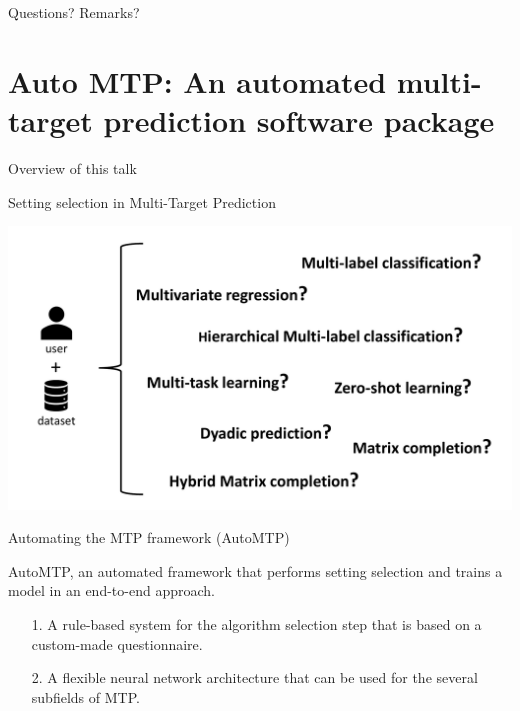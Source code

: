\documentclass[]{beamer}
\begin{document}
\begin{frame}{Questions? Remarks?}
\end{frame}

\section{Auto MTP: An automated multi-target prediction software package}

\begin{frame}{Overview of this talk}

\tableofcontents

\end{frame}

\begin{frame}{Setting selection in Multi-Target Prediction}
\begin{center}
\includegraphics[width=\textwidth]{Dimitris_figures/MTPchoices.pdf}
\end{center}
\end{frame}

\begin{frame}{Automating the MTP framework (AutoMTP)}

 \begin{center}
 AutoMTP, an automated framework that performs setting selection and trains a model in an end-to-end approach.
 \end{center}
 
\begin{itemize}
\item[1.] A rule-based system for the algorithm selection step that is based on a custom-made questionnaire.
\item[2.] A flexible neural network architecture that can be used for the several subfields of MTP.
\end{itemize}
\end{frame}
\end{document}
